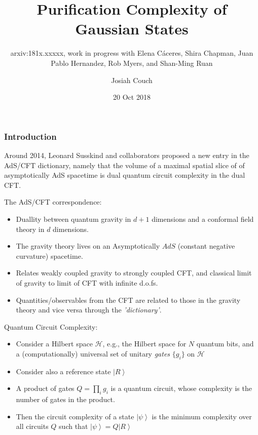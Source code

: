 \documentclass[10pt,aspectratio=169]{beamer}
\title{Purification Complexity of Gaussian States}
\subtitle{arxiv:181x.xxxxx, work in progress with Elena C\'aceres, Shira Chapman, Juan Pablo Hernandez, Rob Myers, and Shan-Ming Ruan}
\author{Josiah Couch}
\institute{University of Texas at Austin}
\date{20 Oct 2018}
\newcommand{\ket}[1]{\left| #1 \right>}
\begin{document}
\begin{frame}
\titlepage\end{frame}

\begin{frame}
\frametitle{Introduction}

Around 2014, Leonard Susskind and collaborators proposed a new entry in the {\color{blue} AdS/CFT dictionary}, namely that the volume of a maximal spatial slice of of asymptotically AdS spacetime is dual {\color{red} quantum circuit complexity} in the dual CFT.


\begin{minipage}[t]{0.48\linewidth}

{\color{blue} The AdS/CFT correspondence}:

\begin{itemize}

	\item Duallity between quantum gravity in $d+1$ dimensions and a conformal field theory in $d$ dimensions.
	
	\item The gravity theory lives on an Asymptotically $AdS$ (constant negative curvature) spacetime. 
	
	\item Relates weakly coupled gravity to strongly coupled CFT, and classical limit of gravity to limit of CFT with infinite d.o.fs.
	
	\item Quantities/observables from the CFT are related to those in the gravity theory and vice versa through the {\it 'dictionary'}.

\end{itemize}

\end{minipage}\hfill
%
\begin{minipage}[t]{0.48\linewidth}

{\color{red} Quantum Circuit Complexity}:

\begin{itemize}

	\item Consider a Hilbert space $\mathcal{H}$, e.g., the Hilbert space for $N$ quantum bits, and a (computationally) universal set of unitary {\it gates} $\{g_i\}$ on $\mathcal{H}$

	\item Consider also a reference state $\ket{R}$
	
	\item A product of gates $Q = \prod_i g_i$ is a quantum circuit, whose complexity is the number of gates in the product.
	
	\item Then the circuit complexity of a state $\ket{\psi}$ is the minimum complexity over all circuits $Q$ such that $\ket{\psi} = Q \ket{R}$

\end{itemize}

\end{minipage}

\end{frame}
\end{document}

